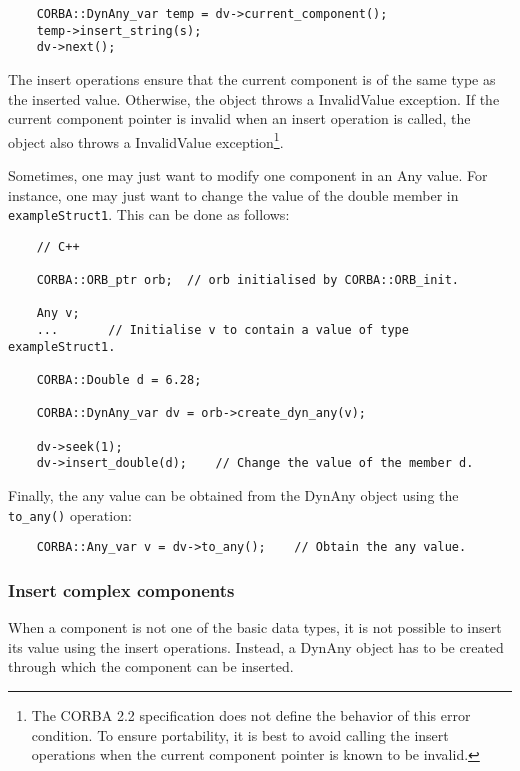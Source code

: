\documentclass[11pt,twoside,onecolumn]{book}
\begin{document}
{\small
\begin{verbatim}
    CORBA::DynAny_var temp = dv->current_component();
    temp->insert_string(s);
    dv->next();
\end{verbatim}
}

The insert operations ensure that the current component is of the same type
as the inserted value. Otherwise, the object throws a InvalidValue
exception. If the current component pointer is invalid when an insert operation
is called, the object also throws a InvalidValue exception\footnote{The
CORBA 2.2 specification does not define the behavior of this error
condition. To ensure portability, it is best to avoid calling the insert
operations when the current component pointer is known to be invalid.}.

Sometimes, one may just want to modify one component in an Any value. For
instance, one may just want to change the value of the double member in
{\tt exampleStruct1}. This can be done as follows:

{\small
\begin{verbatim}
    // C++
    
    CORBA::ORB_ptr orb;  // orb initialised by CORBA::ORB_init.
    
    Any v;
    ...       // Initialise v to contain a value of type exampleStruct1.
    
    CORBA::Double d = 6.28;
    
    CORBA::DynAny_var dv = orb->create_dyn_any(v);
    
    dv->seek(1);
    dv->insert_double(d);    // Change the value of the member d.
\end{verbatim}
}

Finally, the any value can be obtained from the DynAny object using the
{\tt to\_any()} operation:

{\small
\begin{verbatim}
    CORBA::Any_var v = dv->to_any();    // Obtain the any value.
\end{verbatim}
}

\subsubsection{Insert complex components}

When a component is not one of the basic data types, it is not possible to
insert its value using the insert operations. Instead, a DynAny object has
to be created through which the component can be inserted.
\end{document}
